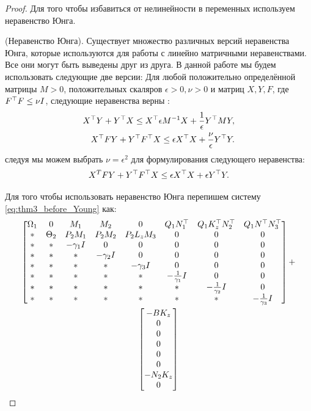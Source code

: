 \begin{proof}
Для того чтобы избавиться от нелинейности в переменных используем неравенство Юнга.

	\begin{lemma}\label{lemma:Young}
		(Неравенство Юнга).
		Существует множество различных версий неравенства Юнга, которые используются для работы с линейно матричными неравенствами. Все они могут быть выведены друг из друга. В данной работе мы будем использовать следующие две версии:
		Для любой положительно определённой матрицы $M>0$, положительных скаляров $\epsilon > 0, \nu > 0$ и матриц ${X}, {Y}, {F}$, где ${F}^\top{F}\leq \nu{I}$, следующие неравенства верны \cite{BOYED1994}:
		\begin{align}
			\label{eq:Young_relation_BMI}
			{X}^\top{Y} + {Y}^\top{X}  \leq {X}^\top 
			\epsilon {M}^{-1}{X} + \frac{1}{\epsilon}   {Y}^\top  {M}{Y}, 
			\\
			\label{eq:Young_robust_2}
			{X}^\top{F}{Y} + {Y}^\top{F}^\top{X}  \leq \epsilon {X}^\top{X} +  \frac{\nu}{\epsilon} {Y}^\top {Y}.
		\end{align}
		следуя \cite{LIEN2008} мы можем выбрать $\nu=\epsilon^2$ для формулирования следующего неравенства:
		\begin{equation}
			\label{eq:updated_Young_robust_2}
			{X}^T{F}{Y} + {Y}^\top{F}^\top{X}  \leq \epsilon {X}^\top{X} + \epsilon {Y}^\top{Y}.
		\end{equation}
	\end{lemma}
	Для того чтобы использовать неравенство Юнга перепишем систему \ref{eq:thm3_before_Young} как:
	\begin{multline}
	\label{eq:thm3_before_Young_2}
	\begin{bmatrix}
		{\Omega}_1 & 0 & {M}_1 & {M}_2 & 0& {Q}_1{N}_1^\top & {Q}_1{K}_z^\top{N}_2^\top & {Q}_1 {N}^\top{N}_3^\top 
		\\
		* & {\Theta}_2 & {P}_2{M}_1 & {P}_2{M}_2 & {P}_2{L}_z{M}_3 & 0 & 0 & 0\\
		* & * & -\gamma_1{I} & 0&0&0&0&0\\
		* & * & * & -\gamma_2{I}&0&0&0&0\\
		* & * & * & *&-\gamma_3{I}&0&0&0\\
		* & * & * & *&*&-\frac{1}{\gamma_1}{I}&0&0\\
		* & * & * & *&*&*&-\frac{1}{\gamma_2}{I}&0\\
		*&* & * & * & *&*&*&-\frac{1}{\gamma_3}{I}
	\end{bmatrix}
	+
	\\
	\begin{bmatrix}
		-B K_z \\0\\0\\0\\0\\0\\-N_2 K_z\\0

\end{bmatrix}
\end{multline}
\end{proof}
